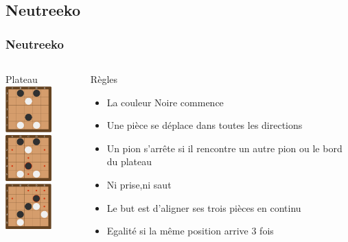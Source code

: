 \documentclass[11pt]{beamer}
\begin{document}
\subsection[Neutreeko]{Neutreeko} 

\begin{frame}

\frametitle{Neutreeko}
\subtitle{Neutreeko}
\begin{columns}[t]
\begin{column}{3cm}
	\begin{block}{Plateau}
	\centering \includegraphics[width=50pt]{images/neut.png}
	\\
	\centering \includegraphics[width=50pt]{images/neut2.png}
	\\
	\centering \includegraphics[width=50pt]{images/neut3.png}
	\end{block} 
\end{column}

\begin{column}{7cm}
	\begin{block}{Règles}
		\begin{itemize}
			\item La couleur Noire commence
			\item Une pièce se déplace dans toutes les directions
			\item Un pion s'arrête si il rencontre un autre pion ou le bord du plateau
			\item Ni prise,ni saut
			\item Le but est d'aligner ses trois pièces en continu
			\item Egalité si la même position arrive 3 fois
		\end{itemize}
	\end{block}   
\end{column}
\end{columns}  
\end{frame}
\end{document}
